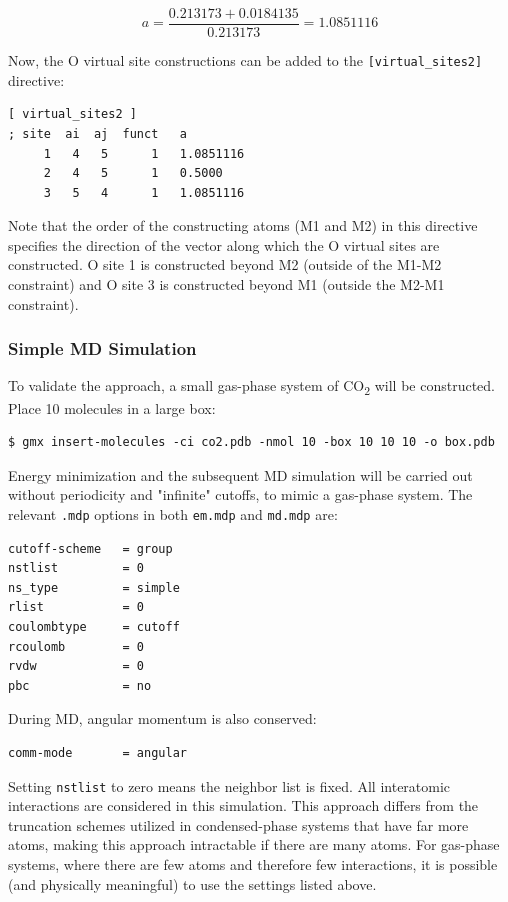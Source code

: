 \documentclass[9pt,tutorial,pubversion]{livecoms}
\begin{document}
\begin{equation}
a = \frac{0.213173+0.0184135}{0.213173} = 1.0851116
\end{equation}

Now, the O virtual site constructions can be added to the \texttt{[virtual\_sites2]} directive:

\begin{lstlisting}
[ virtual_sites2 ]
; site  ai  aj  funct   a
     1   4   5      1   1.0851116
     2   4   5      1   0.5000 
     3   5   4      1   1.0851116
\end{lstlisting}

Note that the order of the constructing atoms (M1 and M2) in this directive specifies the direction of the vector along which the O virtual sites are constructed. O site 1 is constructed beyond M2 (outside of the M1-M2 constraint) and O site 3 is constructed beyond M1 (outside the M2-M1 constraint).

\subsubsection{Simple MD Simulation} \label{vsite_md}

To validate the approach, a small gas-phase system of CO\textsubscript{2} will be constructed. Place 10 molecules in a large box:

\begin{lstlisting}
$ gmx insert-molecules -ci co2.pdb -nmol 10 -box 10 10 10 -o box.pdb
\end{lstlisting}

Energy minimization and the subsequent MD simulation will be carried out without periodicity and "infinite" cutoffs, to mimic a gas-phase system. The relevant \texttt{.mdp} options in both \texttt{em.mdp} and \texttt{md.mdp} are:

\begin{lstlisting}
cutoff-scheme   = group
nstlist         = 0
ns_type         = simple
rlist           = 0
coulombtype     = cutoff
rcoulomb        = 0
rvdw            = 0
pbc             = no
\end{lstlisting}
%
During MD, angular momentum is also conserved:
%
\begin{lstlisting}
comm-mode       = angular
\end{lstlisting}
%
Setting \texttt{nstlist} to zero means the neighbor list is fixed. All interatomic interactions are considered in this simulation. This approach differs from the truncation schemes utilized in condensed-phase systems that have far more atoms, making this approach intractable if there are many atoms. For gas-phase systems, where there are few atoms and therefore few interactions, it is possible (and physically meaningful) to use the settings listed above.
\end{document}
